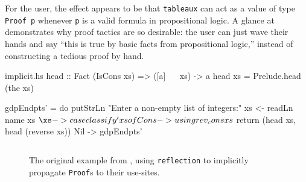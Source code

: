 \documentclass[format=sigplan, review=false, screen=true, 10pt]{acmart}
\begin{document}
For the user, the effect appears to be that \texttt{tableaux} can act as a value of
type \texttt{Proof p} whenever \texttt{p} is a valid formula in propositional logic.
A glance at  demonstrates why proof tactics are so desirable:
the user can just wave their hands and say ``this is true by basic facts from propositional logic,''
instead of constructing a tedious proof by hand.

\begin{filecontents*}{implicit.hs}
head :: Fact (IsCons xs) => ([a] ~~ xs) -> a
head xs = Prelude.head (the xs)

gdpEndpts' = do
  putStrLn "Enter a non-empty list of integers:"  
  xs <- readLn
  name xs $ \xs -> case classify' xs of
    Cons -> using rev_cons xs $
      return (head xs, head (reverse xs))
    Nil  -> gdpEndpts'
\end{filecontents*}

\begin{figure}
  \inputminted{haskell}{implicit.hs}
  \caption{The original example from , using \texttt{reflection} to
    implicitly propagate \texttt{Proof}s to their use-sites.
    \label{implicit}}
\end{figure}
\end{document}
